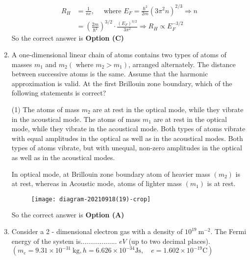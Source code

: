 \begin{enumerate}
\begin{tasks}
	\end{tasks}
	\begin{answer}
		\begin{align*}
		R_{H}&=\frac{1}{n e}, \quad\text{ where }E_{F}=\frac{\hbar^{2}}{2 m}\left(3 \pi^{2} n\right)^{2 / 3} \Rightarrow n\\&=\left(\frac{2 m}{\hbar^{2}}\right)^{3 / 2} \cdot \frac{\left(E_{F}\right)^{3 / 2}}{3 \pi^{2}} \Rightarrow R_{H} \propto E_{F}^{-3 / 2}
		\end{align*}
		So the correct answer is \textbf{Option (C)}
	\end{answer}
	\item A one-dimensional linear chain of atoms contains two types of atoms of masses $m_{1}$ and $m_{2}\left(\right.$ where $\left.m_{2}>m_{1}\right)$, arranged alternately. The distance between successive atoms is the same. Assume that the harmonic approximation is valid. At the first Brillouin zone boundary, which of the following statements is correct?
	{	}
	\begin{tasks}(1)
		\task[\textbf{A.}]  The atoms of mass $m_{2}$ are at rest in the optical mode, while they vibrate in the acoustical mode.
		\task[\textbf{B.}]  The atoms of mass $m_{1}$ are at rest in the optical mode, while they vibrate in the acoustical mode.
		\task[\textbf{C.}] Both types of atoms vibrate with equal amplitudes in the optical as well as in the acoustical modes.
		\task[\textbf{D.}] Both types of atoms vibrate, but with unequal, non-zero amplitudes in the optical as well as in the acoustical modes.
	\end{tasks}
	\begin{answer}
		In optical mode, at Brillouin zone boundary atom of heavier mass $\left(m_{2}\right)$ is at rest, whereas in Acoustic mode, atoms of lighter mass $\left(m_{1}\right)$ is at rest.\\
		\begin{figure}[H]
			\centering
			\texttt{[image: diagram-20210918(19)-crop]}
		\end{figure}
		So the correct answer is \textbf{Option (A)}
	\end{answer}
	\item Consider a 2 - dimensional electron gas with a density of $10^{19} \mathrm{~m}^{-2}$. The Fermi energy of the system is................... $e V$ (up to two decimal places).\\
	$\left(m_{e}=9.31 \times 10^{-31} \mathrm{~kg}, h=6.626 \times 10^{-34} \mathrm{Js}, \quad e=1.602 \times 10^{-19} \mathrm{C}\right)$

\end{enumerate}
